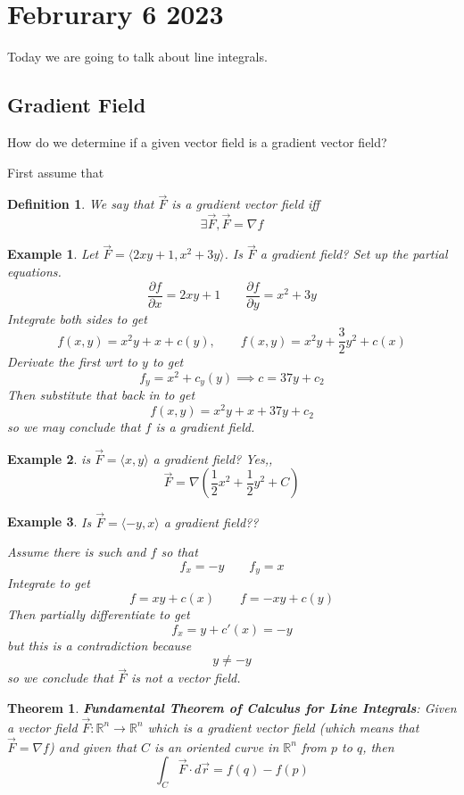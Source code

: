 \documentclass[11pt]{article}
\newtheorem{thm}{Theorem}
\newtheorem{defn}{Definition}
\newtheorem{ex}{Example}
\begin{document}
\section{Februrary 6 2023}
Today we are going to talk about line integrals.
\subsection{Gradient Field}
How do we determine if a given vector field is a gradient vector field?

First assume that
\begin{defn}
  We say that $\vec{F}$ is a gradient vector field iff
\[\exists \vec{F}, \vec{F} = \nabla f\]
\end{defn}
\begin{ex}
  Let $\vec{F} = \langle 2xy+1, x^2+3y \rangle$. Is $\vec{F}$ a gradient field?
  Set up the partial equations.
  \[\frac{\partial f}{\partial x} = 2xy+1 \qquad \frac{\partial f}{\partial y} = x^2+3y\]
  Integrate both sides to get
  \[f(x,y) = x^2y + x + c(y), \qquad f(x,y) = x^2y + \frac{3}{2}y^2 + c(x)\]
  Derivate the first wrt to $y$ to get
  \[f_y = x^2 + c_y(y) \implies c = 37y + c_2\]
  Then substitute that back in to get
  \[f(x,y) = x^2y + x + 37y + c_2\]
  so we may conclude that $f$ is a gradient field.
\end{ex}

\begin{ex}
  is $\vec{F} = \langle x,y\rangle$ a gradient field?
  Yes,,
  \[\vec{F} = \nabla (\frac{1}{2}x^2 + \frac{1}{2}y^2 + C)\]
\end{ex}
\begin{ex}
  Is $\vec{F} = \langle -y, x \rangle$ a gradient field??

  Assume there is such and $f$ so that
  \[f_x = -y \qquad f_y = x\]
  Integrate to get
  \[f = xy + c(x) \qquad f = -xy + c(y)\]
  Then partially differentiate to get
  \[f_x = y  + c'(x) = -y\]
  but this is a contradiction because
  \[y \neq -y\]
  so we conclude that $\vec{F}$ is not a vector field.
\end{ex}

\begin{thm}
  \textbf{Fundamental Theorem of Calculus for Line Integrals}: Given a vector field
  $\vec{F} : \mathbb{R}^n \to \mathbb{R}^n$ which is a gradient vector field (which means
  that $\vec{F} = \nabla f$) and
  given that $C$ is an oriented curve in $\mathbb{R}^n$
  from $p$ to $q$, then
  \[\int_C \vec{F} \cdot d\vec{r} = f(q) - f(p)\]
\end{thm}
\end{document}
